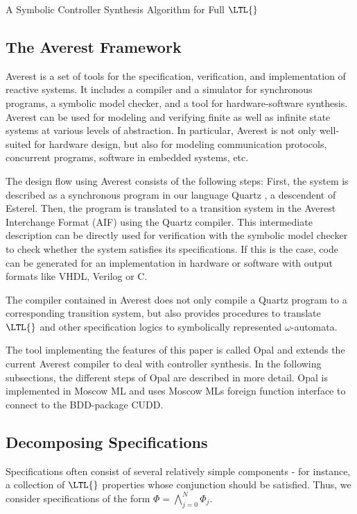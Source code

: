 \documentclass[copyright,creativecommons]{eptcs}
\begin{document}
\begin{section}{A Symbolic Controller Synthesis Algorithm for Full $\LTL{}$}
\label{SymbolicControllerSynthesis}

\subsection{The Averest Framework}

Averest \cite{Schn09} is a set of tools for the specification, verification, and implementation of reactive systems. It includes a compiler and a simulator for synchronous programs, a symbolic model checker, and a tool for hardware-software synthesis. Averest can be used for modeling and verifying finite as well as infinite state systems at various levels of abstraction. In particular, Averest is not only well-suited for hardware design, but also for modeling communication protocols, concurrent programs, software in embedded systems, etc.

The design flow using Averest consists of the following steps: First, the system is described as a synchronous program in our language Quartz \cite{Schn09}, a descendent of Esterel. Then, the program is translated to a transition system in the Averest Interchange Format (AIF) using the Quartz compiler. This intermediate description can be directly used for verification with the symbolic model checker to check whether the system satisfies its specifications. If this is the case, code can be generated for an implementation in hardware or software with output formats like VHDL, Verilog or C.

The compiler contained in Averest does not only compile a Quartz program to a corresponding transition system, but also provides procedures to translate $\LTL{}$ and other specification logics to symbolically represented $\omega$-automata.

The tool implementing the features of this paper is called Opal and extends the current Averest compiler to deal with controller synthesis. In the following subsections, the different steps of Opal are described in more detail. Opal is implemented in Moscow ML and uses Moscow MLs foreign function interface to connect to the BDD-package CUDD.


\subsection{Decomposing Specifications}

Specifications often consist of several relatively simple components - for instance, a collection of $\LTL{}$ properties whose conjunction should be satisfied. Thus, we consider specifications of the form $\Phi = \bigwedge_{j=0}^N \Phi_j$.


\end{section}
\end{document}
